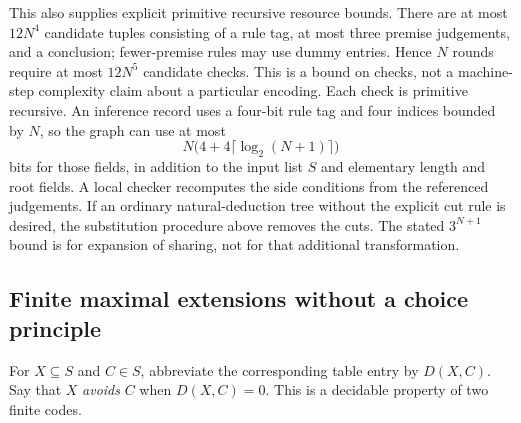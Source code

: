 This also supplies explicit primitive recursive resource bounds. There are
at most $12N^4$ candidate tuples consisting of a rule tag, at most three
premise judgements, and a conclusion; fewer-premise rules may use dummy
entries. Hence $N$ rounds require at most $12N^5$ candidate checks. This is
a bound on checks, not a machine-step complexity claim about a particular
encoding. Each check is primitive recursive. An inference record uses a
four-bit rule tag and four indices bounded by $N$, so the graph can use
at most
\[
          N\bigl(4+4\lceil\log_2(N+1)\rceil\bigr)
\]
bits for those fields, in addition to the input list $S$ and elementary
length and root fields. A local checker recomputes the side conditions from
the referenced judgements. If an ordinary natural-deduction tree without
the explicit cut rule is desired, the substitution procedure above removes
the cuts. The stated $3^{N+1}$ bound is for expansion of sharing, not for
that additional transformation.

\subsection{Finite maximal extensions without a choice principle}

For $X\subseteq S$ and $C\in S$, abbreviate the corresponding table entry
by $D(X,C)$. Say that $X$ \emph{avoids} $C$ when $D(X,C)=0$. This is a
decidable property of two finite codes.

